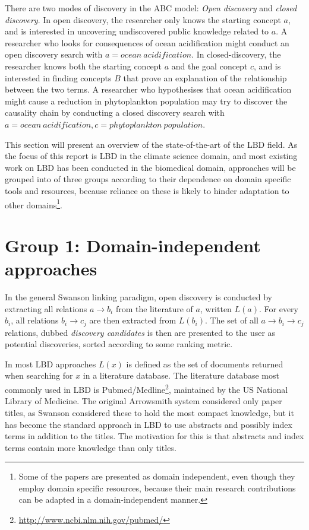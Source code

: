 There are two modes of discovery in the ABC model: \emph{Open discovery} and \emph{closed discovery}. In open discovery, the researcher only knows the starting concept $a$, and is interested in uncovering undiscovered public knowledge related to $a$. A researcher who looks for consequences of ocean acidification might conduct an open discovery search with $a=ocean\ acidification$. In closed-discovery, the researcher knows both the starting concept $a$ and the goal concept $c$, and is interested in finding concepts $B$ that prove an explanation of the relationship between the two terms. A researcher who hypothesises that ocean acidification might cause a reduction in phytoplankton population may try to discover the causality chain by conducting a closed discovery search with $a=ocean\ acidification,c=phytoplankton\ population$.

This section will present an overview of the state-of-the-art of the LBD field. As the focus of this report is LBD in the climate science domain, and most existing work on LBD has been conducted in the biomedical domain, approaches will be grouped into of three groups according to their dependence on domain specific tools and resources, because reliance on these is likely to hinder adaptation to other domains\footnote{Some of the papers are presented as domain independent, even though they employ domain specific resources, because their main research contributions can be adapted in a domain-independent manner.}.

\section{Group 1: Domain-independent approaches}

In the general Swanson linking paradigm, open discovery is conducted by extracting all relations $a \to b_i$ from the literature of $a$, written $L(a)$. For every $b_i$, all relations $b_i \to c_j$ are then extracted from $L(b_i)$. The set of all $a \to b_i \to c_j$ relations, dubbed \emph{discovery candidates} is then are presented to the user as potential discoveries, sorted according to some ranking metric.

In most LBD approaches $L(x)$ is defined as the set of documents returned when searching for $x$ in a literature database. The literature database most commonly used in LBD is Pubmed/Medline\footnote{\url{http://www.ncbi.nlm.nih.gov/pubmed/}}, maintained by the US National Library of Medicine. The original Arrowsmith system considered only paper titles, as Swanson considered these to hold the most compact knowledge, but it has become the standard approach in LBD to use abstracts and possibly index terms in addition to the titles. The motivation for this is that abstracts and index terms contain more knowledge than only titles. 

